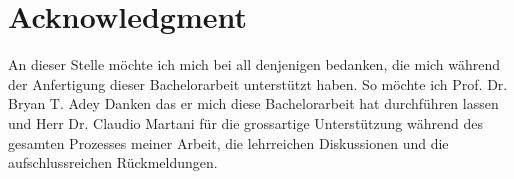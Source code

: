 %
%
%
%

\chapter*{Acknowledgment}
\label{chap:acknowledgment}

An dieser Stelle möchte ich mich bei all denjenigen bedanken, die mich während der Anfertigung dieser Bachelorarbeit unterstützt haben. So möchte ich Prof. Dr. Bryan T. Adey Danken das er mich diese Bachelorarbeit hat durchführen lassen und Herr Dr. Claudio Martani für die grossartige Unterstützung während des gesamten Prozesses meiner Arbeit, die lehrreichen Diskussionen und die aufschlussreichen Rückmeldungen.

%

